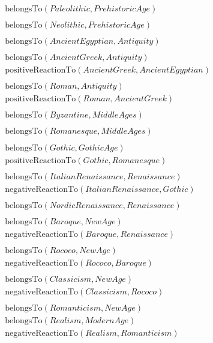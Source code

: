 \documentclass[a4paper, 11pt]{article}
\begin{document}
\begin{align*}
  &\text{belongsTo}(Paleolithic, PrehistoricAge)\\\\
  &\text{belongsTo}(Neolithic, PrehistoricAge)\\\\
  &\text{belongsTo}(AncientEgyptian, Antiquity)\\\\
  &\text{belongsTo}(AncientGreek, Antiquity) \\
  &\text{positiveReactionTo}(AncientGreek, AncientEgyptian)\\\\
  &\text{belongsTo}(Roman, Antiquity) \\
  &\text{positiveReactionTo}(Roman, AncientGreek)\\\\
  &\text{belongsTo}(Byzantine, MiddleAges)\\\\
  &\text{belongsTo}(Romanesque, MiddleAges)\\\\
  &\text{belongsTo}(Gothic, GothicAge) \\
  &\text{positiveReactionTo}(Gothic, Romanesque)\\\\
  &\text{belongsTo}(ItalianRenaissance, Renaissance) \\
  &\text{negativeReactionTo}(ItalianRenaissance, Gothic)\\\\
  &\text{belongsTo}(NordicRenaissance, Renaissance)\\\\
  &\text{belongsTo}(Baroque, NewAge) \\
  &\text{negativeReactionTo}(Baroque, Renaissance)\\\\
  &\text{belongsTo}(Rococo, NewAge) \\
  &\text{negativeReactionTo}(Rococo, Baroque)\\\\
  &\text{belongsTo}(Classicism, NewAge) \\
  &\text{negativeReactionTo}(Classicism, Rococo)\\\\
  &\text{belongsTo}(Romanticism, NewAge) \\
  &\text{belongsTo}(Realism, ModernAge) \\
  &\text{negativeReactionTo}(Realism, Romanticism)\\\\

\end{align*}
\end{document}
